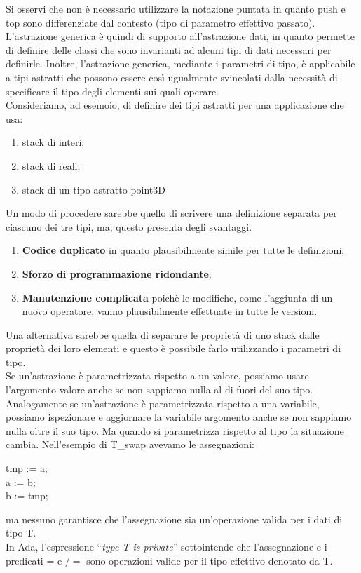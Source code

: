 \documentclass[12pt]{report}
\begin{document}
Si osservi che non è necessario utilizzare la notazione puntata in quanto push e top sono differenziate dal contesto (tipo di parametro effettivo passato). \\
L'astrazione generica è quindi di supporto all'astrazione dati, in quanto permette di definire delle classi che sono invarianti ad alcuni tipi di dati necessari per definirle. Inoltre, l'astrazione generica, mediante i parametri di tipo, è applicabile a tipi astratti che possono essere così ugualmente svincolati dalla necessità di specificare il tipo degli elementi sui quali operare. \\
Consideriamo, ad esemoio, di definire dei tipi astratti per una applicazione che usa:
\begin{enumerate}
	\item stack di interi;
	\item stack di reali;
	\item stack di un tipo astratto point3D
\end{enumerate}
Un modo di procedere sarebbe quello di scrivere una definizione separata per ciascuno dei tre tipi, ma, questo presenta degli svantaggi.
\begin{enumerate}
	\item \textbf{Codice duplicato} in quanto plausibilmente simile per tutte le definizioni;
	\item \textbf{Sforzo di programmazione ridondante};
	\item \textbf{Manutenzione complicata} poichè le modifiche, come l'aggiunta di un nuovo operatore, vanno plausibilmente effettuate in tutte le versioni.
\end{enumerate}
Una alternativa sarebbe quella di separare le proprietà di uno stack dalle proprietà dei loro elementi e questo è possibile farlo utilizzando i parametri di tipo. \\
Se un'astrazione è parametrizzata rispetto a un valore, possiamo usare l'argomento valore anche se non sappiamo nulla al di fuori del suo tipo. Analogamente se un'astrazione è parametrizzata rispetto a una variabile, possiamo ispezionare e aggiornare la variabile argomento anche se non sappiamo nulla oltre il suo tipo. Ma quando si parametrizza rispetto al tipo la situazione cambia. Nell'esempio di T\_swap avevamo le assegnazioni:
\begin{center}
	tmp := a; \\
	a := b; \\
	b := tmp;
\end{center}
ma nessuno garantisce che l'assegnazione sia un'operazione valida per i dati di tipo T. \\
In Ada, l'espressione ``\textit{type T is private}'' sottointende che l'assegnazione e i predicati = e $/=$ sono operazioni valide per il tipo effettivo denotato da T.
\end{document}
